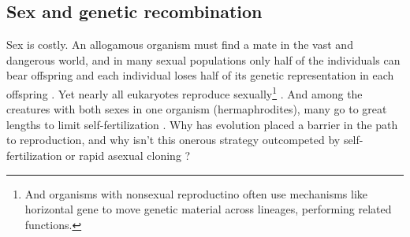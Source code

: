 \documentclass[12pt]{article}
\begin{document}





\subsection{Sex and genetic recombination}


Sex is costly. An allogamous organism must find a mate in the vast and dangerous world, and in many sexual populations only half of the individuals can bear offspring and each individual loses half of its genetic representation in each offspring \citep{smith1971origin, lehtonen2012many, goodenough2014origins}. Yet nearly all eukaryotes reproduce sexually\footnote{And organisms with nonsexual reproductino often use mechanisms like horizontal gene to move genetic material across lineages, performing related functions.}
 \citep{speijer2015sex, bell1982masterpiece}. And among the creatures with both sexes in one organism (hermaphrodites), many go to great lengths to limit self-fertilization \citep{charlesworth2005plant, de1997incompatibility, jarne2006animals}. Why has evolution placed a barrier in the path to reproduction, and why isn't this onerous strategy outcompeted by self-fertilization or rapid asexual cloning \citep{smith1978evolution}?
\end{document}
